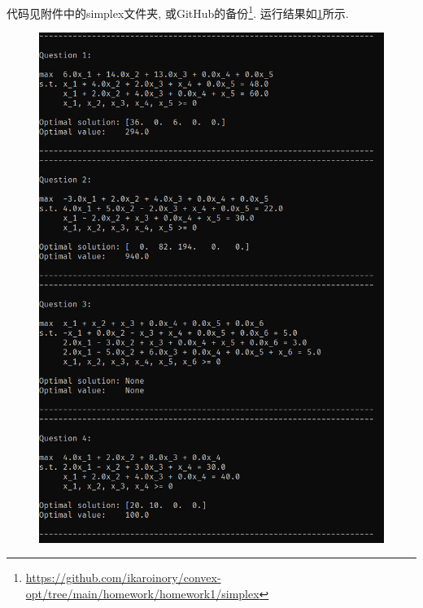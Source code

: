 代码见附件中的simplex文件夹, 或GitHub的备份\footnote{
    \href{https://github.com/ikaroinory/convex-opt/tree/main/homework/homework1/simplex}{https://github.com/ikaroinory/convex-opt/tree/main/homework/homework1/simplex}
}.
运行结果如\cref{figure:14-1}所示.

\begin{figure}
    \centering
    \includegraphics[width=\textwidth]{figures/14-1.png}
    \caption{}
    \label{figure:14-1}
\end{figure}
